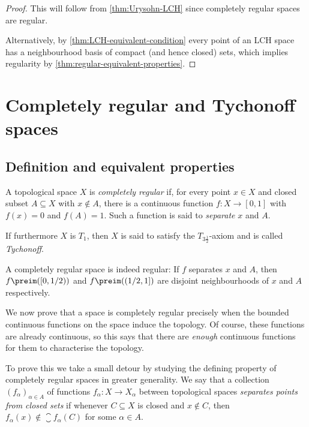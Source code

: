 \documentclass[article, a4paper, 11pt, oneside]{memoir}
\numberwithin{equation}{chapter}
\begin{document}
\begin{proof}
    This will follow from \cref{thm:Urysohn-LCH} since completely regular spaces are regular.

    Alternatively, by \cref{thm:LCH-equivalent-condition} every point of an LCH space has a neighbourhood basis of compact (and hence closed) sets, which implies regularity by \cref{thm:regular-equivalent-properties}.
\end{proof}



\chapter{Completely regular and Tychonoff spaces}

\section{Definition and equivalent properties}

\begin{definition}
    A topological space $X$ is \emph{completely regular} if, for every point $x \in X$ and closed subset $A \subseteq X$ with $x \not\in A$, there is a continuous function $f \colon X \to [0,1]$ with $f(x) = 0$ and $f(A) = 1$. Such a function is said to \emph{separate} $x$ and $A$.

    If furthermore $X$ is $T_1$, then $X$ is said to satisfy the $T_{3\frac{1}{2}}$-axiom and is called \emph{Tychonoff}.
\end{definition}
%
A completely regular space is indeed regular: If $f$ separates $x$ and $A$, then $f\preim([0,1/2))$ and $f\preim((1/2,1])$ are disjoint neighbourhoods of $x$ and $A$ respectively.

We now prove that a space is completely regular precisely when the bounded continuous functions on the space induce the topology. Of course, these functions are already continuous, so this says that there are \emph{enough} continuous functions for them to characterise the topology.

To prove this we take a small detour by studying the defining property of completely regular spaces in greater generality. We say that a collection $(f_\alpha)_{\alpha \in A}$ of functions $f_\alpha \colon X \to X_\alpha$ between topological spaces \emph{separates points from closed sets} if whenever $C \subseteq X$ is closed and $x \not\in C$, then $f_\alpha(x) \not\in \closure{f_\alpha(C)}$ for some $\alpha \in A$.
\end{document}
